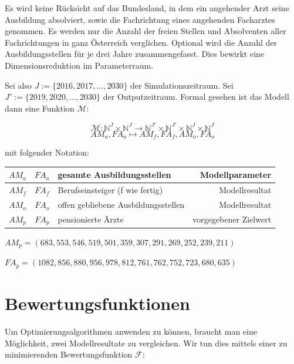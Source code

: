 \documentclass[a4paper,12pt]{article}
\begin{document}
Es wird keine Rücksicht auf das Bundesland, in dem ein angehender Arzt seine Ausbildung absolviert, sowie die Fachrichtung eines angehenden Facharztes genommen. Es werden nur die Anzahl der freien Stellen und Absolventen aller Fachrichtungen in ganz Österreich verglichen. Optional wird die Anzahl der Ausbildungsstellen für je drei Jahre zusammengefasst. Dies bewirkt eine Dimensionsreduktion im Parameterraum.

Sei also $J := \{2016,2017,\hdots,2030\}$ der Simulationszeitraum. Sei $J' := \{2019,2020,\hdots,2030\}$ der Outputzeitraum. Formal gesehen ist das Modell dann eine Funktion $\mathcal M$:

\begin{equation*}
\mathcal M: \mathbb{N}^J \times \mathbb{N}^J \rightarrow \mathbb{N}^{J'} \times \mathbb{N}^{J'} \times \mathbb{N}^{J} \times \mathbb{N}^{J}
\end{equation*}
\begin{equation*}
AM_a, FA_a \mapsto AM_f, FA_f, AM_o, FA_o
\end{equation*}

mit folgender Notation:

\begin{center}
\begin{tabular}{ | c | c | l | r |}
\hline
$AM_a$ & $FA_a$ & gesamte Ausbildungsstellen & Modellparameter \\ \hline
$AM_f$ & $FA_f$ & Berufseinsteiger (f wie fertig) & Modellresultat \\ \hline
$AM_o$ & $FA_o$ & offen gebliebene Ausbildungsstellen & Modellresultat \\ \hline
$AM_p$ & $FA_p$ & pensionierte Ärzte & vorgegebener Zielwert \\ \hline
\end{tabular}
\end{center}

$AM_p = (683, 553, 546, 519, 501, 359, 307, 291, 269, 252, 239, 211)$

$FA_p = (1082, 856, 880, 956, 978, 812, 761, 762, 752, 723, 680, 635)$

\section{Bewertungsfunktionen}

Um Optimierungsalgorithmen anwenden zu können, braucht man eine Möglichkeit, zwei Modellresultate zu vergleichen. Wir tun dies mittels einer zu minimierenden Bewertungsfunktion $\mathcal F$:
\end{document}
